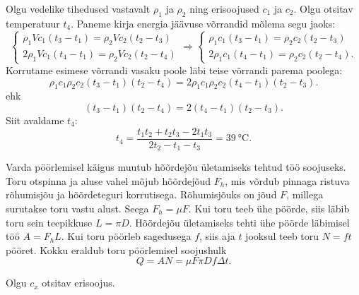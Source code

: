 \documentclass[10pt, twoside]{article}
\begin{document}
{
\solu
Olgu vedelike tihedused vastavalt $\rho_1$ ja $\rho_2$ ning erisoojused $c_1$ ja $c_2$. Olgu otsitav temperatuur $t_4$. Paneme kirja energia jäävuse võrrandid mõlema segu jaoks:
\[
\left\{\begin{array}{l}
	{\rho_{1} V c_{1}\left(t_{3}-t_{1}\right)=\rho_{2} V c_{2}\left(t_{2}-t_{3}\right)} \\ {2 \rho_{1} V c_{1}\left(t_{4}-t_{1}\right)=\rho_{2} V c_{2}\left(t_{2}-t_{4}\right)}\end{array} \Rightarrow\left\{\begin{array}{l}{\rho_{1} c_{1}\left(t_{3}-t_{1}\right)=\rho_{2} c_{2}\left(t_{2}-t_{3}\right)} \\ {2 \rho_{1} c_{1}\left(t_{4}-t_{1}\right)=\rho_{2} c_{2}\left(t_{2}-t_{4}\right).}
\end{array}\right.\right.
\]
Korrutame esimese võrrandi vasaku poole läbi teise võrrandi parema poolega:
\[
\rho_{1} c_{1} \rho_{2} c_{2}\left(t_{3}-t_{1}\right)\left(t_{2}-t_{4}\right) =2 \rho_{1} c_{1} \rho_{2} c_{2}\left(t_{4}-t_{1}\right)\left(t_{2}-t_{3}\right).
\]
ehk
\[
\left(t_{3}-t_{1}\right)\left(t_{2}-t_{4}\right) =2\left(t_{4}-t_{1}\right)\left(t_{2}-t_{3}\right).
\]
Siit avaldame $t_4$:
\[
t_{4}=\frac{t_{1} t_{2}+t_{2} t_{3}-2 t_{1} t_{3}}{2 t_{2}-t_{1}-t_{3}}=\SI{39}{\degreeCelsius}.
\]
\probend
\bigskip


\solu
Varda pöörlemisel käigus muutub hõõrdejõu ületamiseks tehtud töö soojuseks. Toru otspinna ja aluse vahel mõjub hõõrdejõud $F_h$, mis võrdub pinnaga ristuva rõhumisjõu ja hõõrdeteguri korrutisega. Rõhumisjõuks on jõud $F$, millega surutakse toru vastu alust. Seega $F_h = \mu F$. Kui toru teeb ühe pöörde, siis läbib toru sein teepikkuse $L = \pi D$. Hõõrdejõu ületamiseks tehti ühe pöörde läbimisel töö $A = F_hL$. Kui toru pöörleb sagedusega $f$, siis aja $t$ jooksul teeb toru $N = f t$ pööret. Kokku eraldub toru pöörlemisel soojushulk
\[
Q=A N=\mu F \pi D f \Delta t.
\]
\probend
\bigskip


\solu
Olgu $c_x$ otsitav erisoojus.

}
\end{document}
